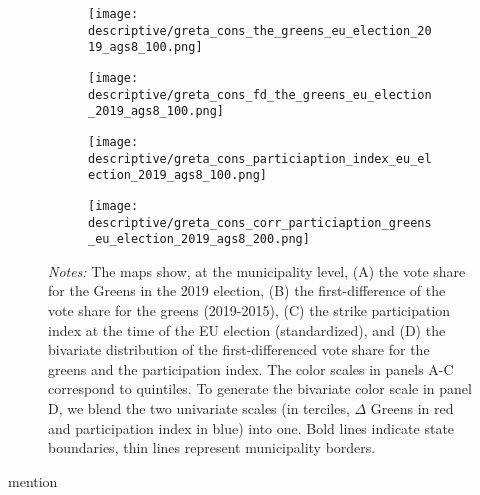 \begin{figure}[H]\centering
	\caption{Spatial correlation of the vote share of the Greens and strike participation}
	\label{fig_greta_cons:spatial_correlation_greens_index}
	\begin{subfigure}[h]{0.45\linewidth}\centering
		\texttt{[image: descriptive/greta\_cons\_the\_greens\_eu\_election\_2019\_ags8\_100.png]}
	\end{subfigure}
	\begin{subfigure}[h]{0.45\linewidth}\centering
		\texttt{[image: descriptive/greta\_cons\_fd\_the\_greens\_eu\_election\_2019\_ags8\_100.png]}
	\end{subfigure}
	\begin{subfigure}[h]{0.45\linewidth}\centering
		\texttt{[image: descriptive/greta\_cons\_particiaption\_index\_eu\_election\_2019\_ags8\_100.png]}
	\end{subfigure}
	\begin{subfigure}[h]{0.45\linewidth}\centering
		\texttt{[image: descriptive/greta\_cons\_corr\_particiaption\_greens\_eu\_election\_2019\_ags8\_200.png]}
	\end{subfigure}

	\begin{minipage}{0.9\linewidth}
		\scriptsize{\emph{Notes:} The maps show, at the municipality level, (A) the vote share for the Greens in the 2019 election, (B) the first-difference of the vote share for the greens (2019-2015), (C) the strike participation index at the time of the EU election (standardized), and (D) the bivariate distribution of the first-differenced vote share for the greens and the participation index. The color scales in panels A-C correspond to quintiles. To generate the bivariate color scale in panel D, we blend the two univariate scales (in terciles, $\Delta$ Greens in red and participation index in blue) into one. Bold lines indicate state boundaries, thin lines represent municipality borders.}
	\end{minipage}
\end{figure}


mention \cite{cantoni2020persistence}


